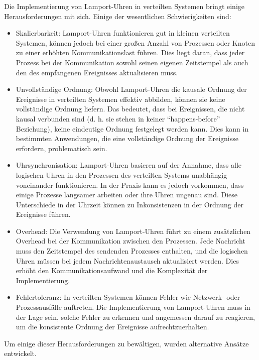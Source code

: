 \documentclass[../vs-script-first-v01.tex]{subfiles}
\begin{document}
Die Implementierung von Lamport-Uhren in verteilten Systemen bringt einige Herausforderungen mit sich. Einige der wesentlichen Schwierigkeiten sind:
\begin{itemize}
\item Skalierbarkeit: Lamport-Uhren funktionieren gut in kleinen verteilten Systemen, können jedoch bei einer großen Anzahl von Prozessen oder Knoten zu einer erhöhten Kommunikationslast führen. Dies liegt daran, dass jeder Prozess bei der Kommunikation sowohl seinen eigenen Zeitstempel als auch den des empfangenen Ereignisses aktualisieren muss.
\item Unvollständige Ordnung: Obwohl Lamport-Uhren die kausale Ordnung der Ereignisse in verteilten Systemen effektiv abbilden, können sie keine vollständige Ordnung liefern. Das bedeutet, dass bei Ereignissen, die nicht kausal verbunden sind (d. h. sie stehen in keiner \enquote{happens-before} Beziehung), keine eindeutige Ordnung festgelegt werden kann. Dies kann in bestimmten Anwendungen, die eine vollständige Ordnung der Ereignisse erfordern, problematisch sein.
\item Uhrsynchronisation: Lamport-Uhren basieren auf der Annahme, dass alle logischen Uhren in den Prozessen des verteilten Systems unabhängig voneinander funktionieren. In der Praxis kann es jedoch vorkommen, dass einige Prozesse langsamer arbeiten oder ihre Uhren ungenau sind. Diese Unterschiede in der Uhrzeit können zu Inkonsistenzen in der Ordnung der Ereignisse führen.
\item Overhead: Die Verwendung von Lamport-Uhren führt zu einem zusätzlichen Overhead bei der Kommunikation zwischen den Prozessen. Jede Nachricht muss den Zeitstempel des sendenden Prozesses enthalten, und die logischen Uhren müssen bei jedem Nachrichtenaustausch aktualisiert werden. Dies erhöht den Kommunikationsaufwand und die Komplexität der Implementierung.
\item Fehlertoleranz: In verteilten Systemen können Fehler wie Netzwerk- oder Prozessausfälle auftreten. Die Implementierung von Lamport-Uhren muss in der Lage sein, solche Fehler zu erkennen und angemessen darauf zu reagieren, um die konsistente Ordnung der Ereignisse aufrechtzuerhalten.
\end{itemize}
Um einige dieser Herausforderungen zu bewältigen, wurden alternative Ansätze entwickelt. 
\end{document}
